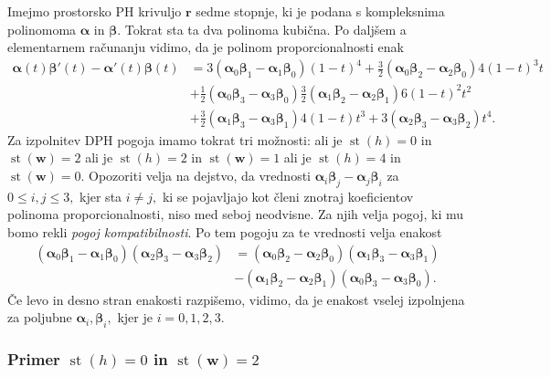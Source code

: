 \documentclass[12pt,a4paper,twoside]{article}
\theoremstyle{definition} %
\theoremstyle{plain} %
\theoremstyle{primerstyle}
\numberwithin{equation}{section}  %
\newcommand{\rV}{\mathbf{r}}
\newcommand{\wV}{\mathbf{w}}
\newcommand{\balpha}{\boldsymbol \alpha}
\newcommand{\bbeta}{\boldsymbol \beta}
\DeclareMathOperator{\st}{st}
\begin{document}
Imejmo prostorsko PH krivuljo $\rV$ sedme stopnje, ki je podana s kompleksnima polinomoma $\balpha$ in $\bbeta.$ Tokrat sta ta dva polinoma kubična. Po daljšem a elementarnem računanju vidimo, da je polinom proporcionalnosti enak
\begin{align}
	\balpha(t)\bbeta'(t)-\balpha'(t)\bbeta(t)&=3(\balpha_0\bbeta_1-\balpha_1\bbeta_0)(1-t)^4+\frac{3}{2}(\balpha_0\bbeta_2-\balpha_2\bbeta_0)4(1-t)^3t\nonumber\\
	&+\frac{1}{2}(\balpha_0\bbeta_3-\balpha_3\bbeta_0)\frac{3}{2}(\balpha_1\bbeta_2-\balpha_2\bbeta_1)6(1-t)^2t^2\label{propoly_bern_7}\\
	&+\frac{3}{2}(\balpha_1\bbeta_3-\balpha_3\bbeta_1)4(1-t)t^3+3(\balpha_2\bbeta_3-\balpha_3\bbeta_2)t^4.\nonumber
\end{align}
Za izpolnitev DPH pogoja imamo tokrat tri možnosti: ali je $\st(h)=0$ in $\st(\wV)=2$ ali je $\st(h)=2$ in $\st(\wV)=1$ ali je $\st(h)=4$ in $\st(\wV)=0.$ Opozoriti velja na dejstvo, da vrednosti $\balpha_i\bbeta_j-\balpha_j\bbeta_i$ za $0\leq i,j\leq 3,$ kjer sta $i\neq j,$ ki se pojavljajo kot členi znotraj koeficientov polinoma proporcionalnosti, niso med seboj neodvisne. Za njih velja pogoj, ki mu bomo rekli \emph{pogoj kompatibilnosti}. Po tem pogoju za te vrednosti velja enakost
\begin{align}
	(\balpha_0\bbeta_1-\balpha_1\bbeta_0)(\balpha_2\bbeta_3-\balpha_3\bbeta_2)&=(\balpha_0\bbeta_2-\balpha_2\bbeta_0)(\balpha_1\bbeta_3-\balpha_3\bbeta_1)\nonumber\\
	&-(\balpha_1\bbeta_2-\balpha_2\bbeta_1)(\balpha_0\bbeta_3-\balpha_3\bbeta_0).\label{pogoj_kompatibilnosti}
\end{align}
Če levo in desno stran enakosti razpišemo, vidimo, da je enakost vselej izpolnjena za poljubne $\balpha_i,\bbeta_i,$ kjer je $i=0,1,2,3.$

\subsubsection{Primer \texorpdfstring{$\st(h)=0$}{st(h)=0} in \texorpdfstring{$\st(\wV)=2$}{st(w)=2}}
\label{klasifikacija_h0w2}
\end{document}

